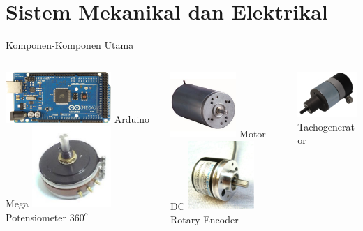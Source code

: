 \documentclass[10pt,xcolor={dvipsnames}]{beamer}
\begin{document}
\section{Sistem Mekanikal dan Elektrikal}
\begin{frame}{Komponen-Komponen Utama}
	\begin{columns}[T]
		\begin{column}{0.31\textwidth}
			\begin{center}
				\includegraphics[width=4cm]{Gambar Komponen/MEGA.jpg}
				Arduino Mega\newline\newline
				\includegraphics[width=3cm]{Gambar Komponen/POT.jpg}
				Potensiometer $360^o$
			\end{center}
		\end{column}
		\begin{column}{0.31\textwidth}
			\begin{center}
				\includegraphics[width=2.5cm]{Gambar Komponen/MOTOR.jpg}
				\newline Motor DC\newline\newline
				\includegraphics[width=2.5cm]{Gambar Komponen/ENCODER.jpg}
				\newline Rotary Encoder
			\end{center}
		\end{column}
		\begin{column}{0.31\textwidth}
			\begin{center}
				\includegraphics[width=2.5cm]{Gambar Komponen/TACHO.png}
				\newline Tachogenerator
			\end{center}
		\end{column}
	\end{columns}
\end{frame}
\end{document}
